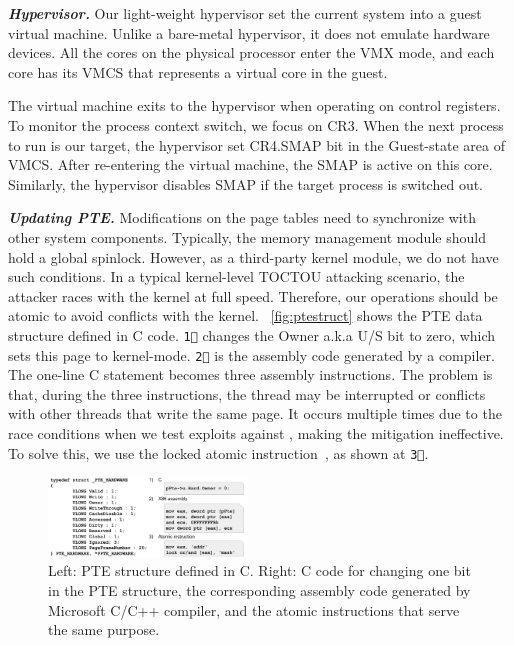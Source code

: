 \textbf{\textit{Hypervisor.}} Our light-weight hypervisor set the current system into a guest virtual machine. Unlike a bare-metal hypervisor, it does not emulate hardware devices. All the cores on the physical processor enter the VMX mode, and each core has its VMCS that represents a virtual core in the guest.  

The virtual machine exits to the hypervisor when operating on control registers. To monitor the process context switch, we focus on CR3. When the next process to run is our target, the hypervisor set CR4.SMAP bit in the Guest-state area of VMCS. After re-entering the virtual machine, the SMAP is active on this core. Similarly, the hypervisor disables SMAP if the target process is switched out.


\textbf{\textit{Updating PTE.}} 
Modifications on the page tables need to synchronize with other system components. Typically, the memory management module should hold a global spinlock. However, as a third-party kernel module, we do not have such conditions. In a typical kernel-level TOCTOU attacking scenario, the attacker races with the kernel at full speed. Therefore, our operations should be atomic to avoid conflicts with the kernel. ~\autoref{fig:ptestruct} shows the PTE data structure defined in C code. \texttt{\textcircled{1}} changes the Owner a.k.a U/S bit to zero, which sets this page to kernel-mode. \texttt{\textcircled{2}} is the assembly code generated by a compiler. The one-line C statement becomes three assembly instructions. The problem is that, during the three instructions, the thread may be interrupted or conflicts with other threads that write the same page. It occurs multiple times due to the race conditions when we test exploits against \name, making the mitigation ineffective. To solve this, we use the locked atomic instruction~\cite{intelmanualchapter8}, as shown at \texttt{\textcircled{3}}. 

\begin{figure}[th]
  \includegraphics[width=0.47\textwidth]{figures/ptestructcode}
  \centering
  \caption{Left: PTE structure defined in C. Right: C code for changing one bit in the PTE structure, the corresponding assembly code generated by Microsoft C/C++ compiler, and the atomic instructions that serve the same purpose.}
  \label{fig:ptestruct}
\end{figure}


